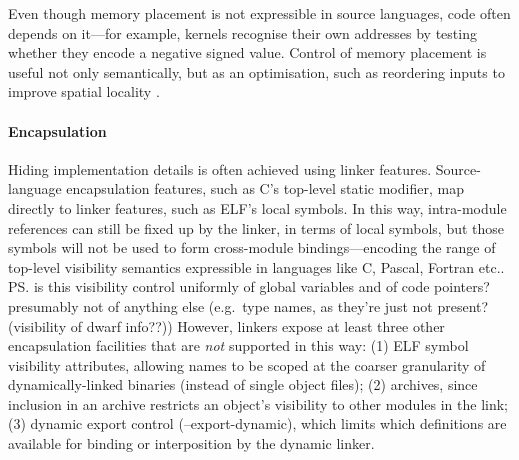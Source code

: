 Even though memory placement is not expressible in source languages, 
code often depends on it---for example, kernels recognise their own addresses
by testing whether they encode a negative signed value.
Control of memory placement is useful not only semantically, 
but as an optimisation, such as 
reordering inputs to improve spatial locality \citep{orr_dynamic_1994}.


\paragraph{Encapsulation}
Hiding implementation details is often achieved using linker features. 
Source-language encapsulation features,
such as C's top-level \textsf{static} modifier, 
map directly to linker features, such as ELF's local symbols.
In this way, intra-module references can still be fixed up by the linker,
in terms of local symbols, but those symbols 
will not be used to form cross-module bindings---encoding the range of top-level
visibility semantics expressible in languages like C, Pascal, Fortran etc..
\ps{is this visibility control uniformly of global variables and of
  code pointers?  presumably not of anything else (e.g.~type names, as
  they're just not present?  (visibility of dwarf info??))}
However, linkers expose at least three other encapsulation facilities
that are \emph{not} supported in this way: (1) ELF symbol visibility attributes,
allowing names to be scoped at the coarser granularity of 
dynamically-linked binaries (instead of single object files);
(2) archives,
since inclusion in an archive restricts an object's visibility 
to other modules in the link;
(3) dynamic export control (\textsf{--export-dynamic}), which limits 
which definitions are available for binding or interposition by the dynamic linker.
